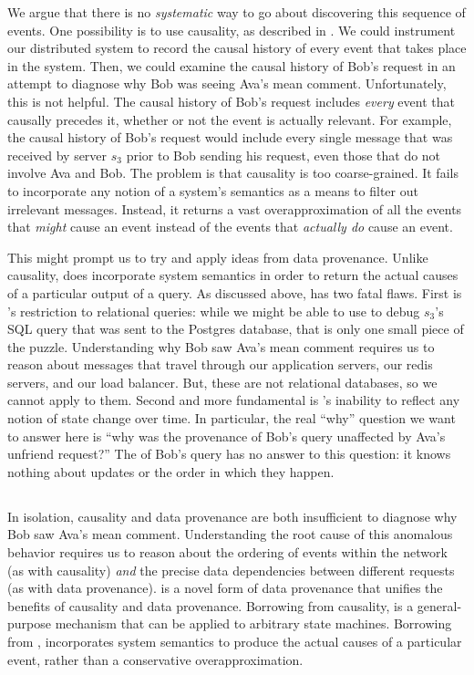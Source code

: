 We argue that there is no \emph{systematic} way to go about discovering this
sequence of events. One possibility is to use causality, as described in
. We could instrument our distributed system to record the
causal history of every event that takes place in the system. Then, we could
examine the causal history of Bob's request in an attempt to diagnose why Bob
was seeing Ava's mean comment. Unfortunately, this is not helpful. The causal
history of Bob's request includes \emph{every} event that causally precedes it,
whether or not the event is actually relevant. For example, the causal history
of Bob's request would include every single message that was received by server
$s_3$ prior to Bob sending his request, even those that do not involve Ava and
Bob. The problem is that causality is too coarse-grained. It fails to
incorporate any notion of a system's semantics as a means to filter out
irrelevant messages.  Instead, it returns a vast overapproximation of all the
events that \emph{might} cause an event instead of the events that
\emph{actually do} cause an event.

This might prompt us to try and apply ideas from data provenance. Unlike
causality, \whyprovenance{} does incorporate system semantics in order to
return the actual causes of a particular output of a query. As discussed
above, \whyprovenance{} has two fatal flaws.  First is \whyprovenance{}'s
restriction to relational queries: while we might be able to use
\whyprovenance{} to debug $s_3$'s SQL query that was sent to the Postgres
database, that is only one small piece of the puzzle.  Understanding why Bob
saw Ava's mean comment requires us to reason about messages that travel through
our application servers, our redis servers, and our load balancer. But, these
are not relational databases, so we cannot apply \whyprovenance{} to them.
Second and more fundamental is \whyprovenance{}'s inability to reflect any
notion of state change over time.  In particular, the real ``why'' question we
want to answer here is ``why was the provenance of Bob's query unaffected by
Ava's unfriend request?'' The \whyprovenance{} of Bob's query has no answer to
this question: it knows nothing about updates or the order in which they
happen.

\subsection{\WatProvenance{}}
In isolation, causality and data provenance are both insufficient to diagnose
why Bob saw Ava's mean comment. Understanding the root cause of this anomalous
behavior requires us to reason about the ordering of events within the network
(as with causality) \emph{and} the precise data dependencies between different
requests (as with data provenance).
%
 is a novel form of data provenance that unifies the
benefits of causality and data provenance. Borrowing from causality,
\watprovenance{} is a general-purpose mechanism that can be applied to
arbitrary state machines. Borrowing from \whyprovenance{}, \watprovenance{}
incorporates system semantics to produce the actual causes of a particular
event, rather than a conservative overapproximation.

